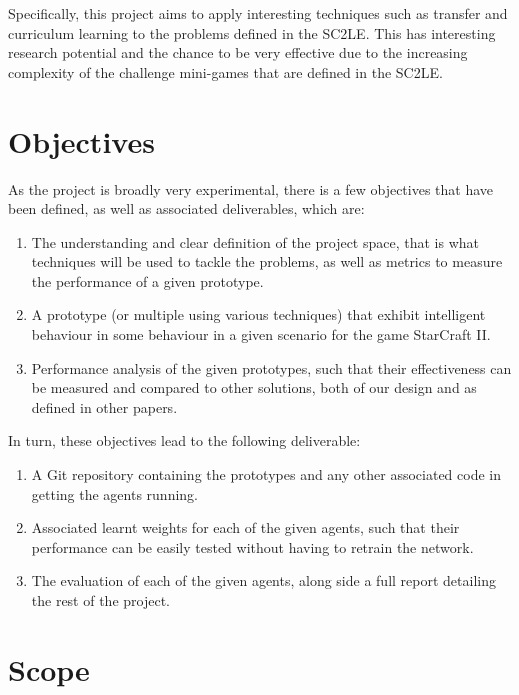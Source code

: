 Specifically, this project aims to apply interesting techniques such as
transfer and curriculum learning to the problems defined in the SC2LE\@.
This has interesting research potential and the chance to be very effective
due to the increasing complexity of the challenge mini-games that are defined
in the SC2LE\@.

\section{Objectives}

As the project is broadly very experimental, there is a few objectives that
have been defined, as well as associated deliverables, which are:

\begin{enumerate}
    \item The understanding and clear definition of the project space, that is
        what techniques will be used to tackle the problems, as well as
        metrics to measure the performance of a given prototype.
    \item A prototype (or multiple using various techniques) that exhibit
        intelligent behaviour in some behaviour in a given scenario for
        the game StarCraft II\@.
    \item Performance analysis of the given prototypes, such that their
        effectiveness can be measured and compared to other solutions, both of
        our design and as defined in other papers.
\end{enumerate}

In turn, these objectives lead to the following deliverable:

\begin{enumerate}
    \item A Git repository containing the prototypes and any other associated
        code in getting the agents running.
    \item Associated learnt weights for each of the given agents, such that
        their performance can be easily tested without having to retrain
        the network.
    \item The evaluation of each of the given agents, along side a full report
        detailing the rest of the project.
\end{enumerate}

\section{Scope}

